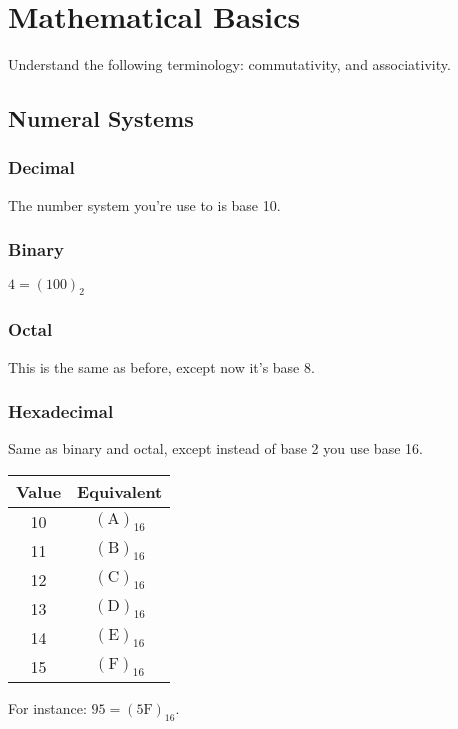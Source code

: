 \chapter{Mathematical Basics}

Understand the following terminology: commutativity, and associativity.

\section{Numeral Systems}

\subsection{Decimal}

The number system you're use to is base 10.

\subsection{Binary}

$4 = (100)_2$

\subsection{Octal}

This is the same as before, except now it's base 8.

\subsection{Hexadecimal}

Same as binary and octal, except instead of base 2 you use base 16.

\begin{tabular}{c c}
  \hline
  Value & Equivalent \\
  \hline
  10 & $(\text{A})_{16}$ \\
  11 & $(\text{B})_{16}$ \\
  12 & $(\text{C})_{16}$ \\
  13 & $(\text{D})_{16}$ \\
  14 & $(\text{E})_{16}$ \\
  15 & $(\text{F})_{16}$ \\
\end{tabular}

For instance: $95 = (5\text{F})_{16}$.
